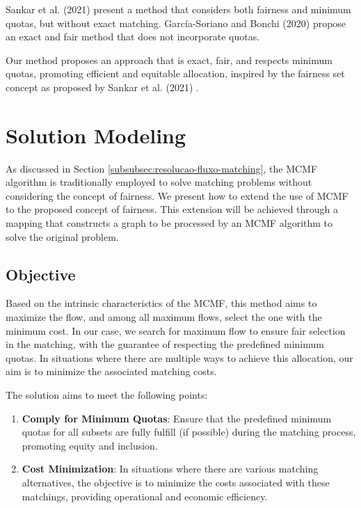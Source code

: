         Sankar et al. (2021) \cite{sankar2021set} present a method that considers both fairness and minimum quotas, but without exact matching. García-Soriano and Bonchi (2020) \cite{garcia2020fair} propose an exact and fair method that does not incorporate quotas.
        
        Our method proposes an approach that is exact, fair, and respects minimum quotas, promoting efficient and equitable allocation, inspired by the fairness set concept as proposed by Sankar et al. (2021) \cite{sankar2021set}.

        
        \section{Solution Modeling}
        
            As discussed in Section {\ref{subsubsec:resolucao-fluxo-matching}}, the MCMF algorithm is traditionally employed to solve matching problems without considering the concept of fairness. We present how to extend the use of MCMF to the proposed concept of fairness. This extension will be achieved through a mapping that constructs a graph to be processed by an MCMF algorithm to solve the original problem.
            
            \subsection{Objective}
            
                Based on the intrinsic characteristics of the MCMF, this method aims to maximize the flow, and among all maximum flows, select the one with the minimum cost.
                In our case, we search for maximum flow to ensure fair selection in the matching, with the guarantee of respecting the predefined minimum quotas. In situations where there are multiple ways to achieve this allocation, our aim is to minimize the associated matching costs.
                
                The solution aims to meet the following points:
                
                \begin{enumerate} \item \textbf{Comply for Minimum Quotas}: Ensure that the predefined minimum quotas for all subsets are fully fulfill (if possible) during the matching process, promoting equity and inclusion. \item \textbf{Cost Minimization}: In situations where there are various matching alternatives, the objective is to minimize the costs associated with these matchings, providing operational and economic efficiency. \end{enumerate}
        
